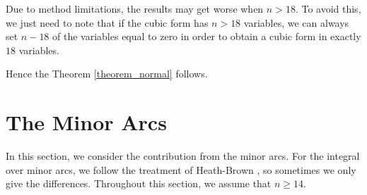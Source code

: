 \documentclass[12pt]{amsart}
\theoremstyle{definition}
\numberwithin{equation}{section}
\begin{document}
\begin{table}[h!]\footnotesize\tabcolsep 16pt
    \begin{center}
    \caption{The case of $14 \leq n \leq 18$}\label{tab2}\vspace{-2mm}
    \end{center}
    \begin{center}
    \end{center}
\end{table}

Due to method limitations, the results may get worse when $n>18$. To avoid this, we just need to note that if the cubic form has $n > 18$ variables, we can always set $n-18$ of the variables equal to zero in order to obtain a cubic form in exactly $18$ variables. 

Hence the Theorem \ref{theorem_normal} follows.


\section{The Minor Arcs}

In this section, we consider the contribution from the minor arcs. For the integral over minor arcs, we follow the treatment of Heath-Brown \cite{heath2007cubic}, so sometimes we only give the differences. Throughout this section, we assume that $n \geq 14$.
\end{document}
